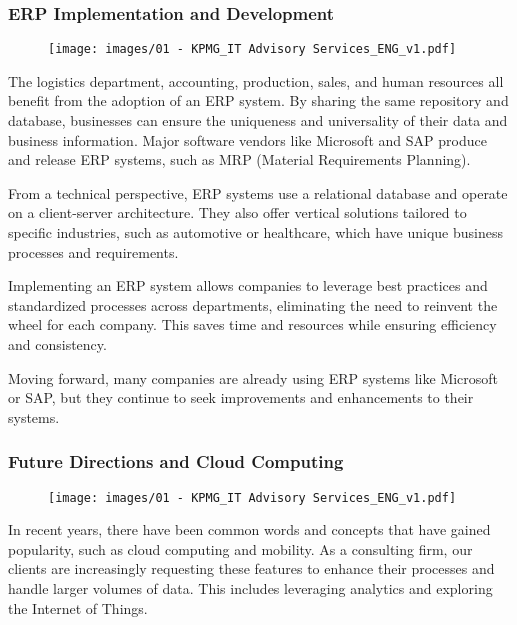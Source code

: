 \subsubsection{ERP Implementation and
    Development}\label{erp-implementation-and-development}

\begin{figure}[!h]
    \centering
    \texttt{[image: images/01 - KPMG\_IT Advisory Services\_ENG\_v1.pdf]}
\end{figure}

The logistics department, accounting, production, sales, and human
resources all benefit from the adoption of an ERP system. By sharing the
same repository and database, businesses can ensure the uniqueness and
universality of their data and business information. Major software
vendors like Microsoft and SAP produce and release ERP systems, such as
MRP (Material Requirements Planning).

From a technical perspective, ERP systems use a relational database and
operate on a client-server architecture. They also offer vertical
solutions tailored to specific industries, such as automotive or
healthcare, which have unique business processes and requirements.

Implementing an ERP system allows companies to leverage best practices
and standardized processes across departments, eliminating the need to
reinvent the wheel for each company. This saves time and resources while
ensuring efficiency and consistency.

Moving forward, many companies are already using ERP systems like
Microsoft or SAP, but they continue to seek improvements and
enhancements to their systems.

\subsubsection{Future Directions and Cloud
    Computing}\label{future-directions-and-cloud-computing}

\begin{figure}[!h]
    \centering
    \texttt{[image: images/01 - KPMG\_IT Advisory Services\_ENG\_v1.pdf]}
\end{figure}

In recent years, there have been common words and concepts that have
gained popularity, such as cloud computing and mobility. As a consulting
firm, our clients are increasingly requesting these features to enhance
their processes and handle larger volumes of data. This includes
leveraging analytics and exploring the Internet of Things.

